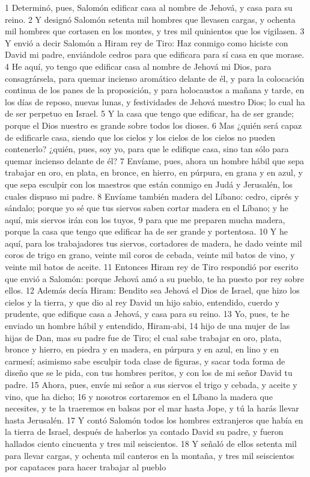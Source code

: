 1 Determinó, pues, Salomón edificar casa al nombre de Jehová, y casa para su reino.
2 Y designó Salomón setenta mil hombres que llevasen cargas, y ochenta mil hombres que cortasen en los montes, y tres mil quinientos que los vigilasen.
3 Y envió a decir Salomón a Hiram rey de Tiro: Haz conmigo como hiciste con David mi padre, enviándole cedros para que edificara para sí casa en que morase.
4 He aquí, yo tengo que edificar casa al nombre de Jehová mi Dios, para consagrársela, para quemar incienso aromático delante de él, y para la colocación continua de los panes de la proposición, y para holocaustos a mañana y tarde, en los días de reposo, nuevas lunas, y festividades de Jehová nuestro Dios; lo cual ha de ser perpetuo en Israel.
5 Y la casa que tengo que edificar, ha de ser grande; porque el Dios nuestro es grande sobre todos los dioses.
6 Mas ¿quién será capaz de edificarle casa, siendo que los cielos y los cielos de  los cielos no pueden contenerlo? ¿quién, pues, soy yo, para que le edifique casa, sino tan sólo para quemar incienso delante de él?
7 Envíame, pues, ahora un hombre hábil que sepa trabajar en oro, en plata, en bronce, en hierro, en púrpura, en grana y en azul, y que sepa esculpir con los maestros que están conmigo en Judá y Jerusalén, los cuales dispuso mi padre.
8 Envíame también madera del Líbano: cedro, ciprés y sándalo; porque yo sé que tus siervos saben cortar madera en el Líbano; y he aquí, mis siervos irán con los tuyos,
9 para que me preparen mucha madera, porque la casa que tengo que edificar ha de ser grande y portentosa.
10 Y he aquí, para los trabajadores tus siervos, cortadores de madera, he dado veinte mil coros   de trigo en grano, veinte mil coros de cebada, veinte mil batos de vino, y veinte mil batos de aceite.
11 Entonces Hiram rey de Tiro respondió por escrito que envió a Salomón: porque Jehová amó a su pueblo, te ha puesto por rey sobre ellos.
12 Además decía Hiram: Bendito sea Jehová el Dios de Israel, que hizo los cielos y la tierra, y que dio al rey David un hijo sabio, entendido, cuerdo y prudente, que edifique casa a Jehová, y casa para su reino.
13 Yo, pues, te he enviado un hombre hábil y entendido, Hiram-abi,
14 hijo de una mujer de las hijas de Dan, mas su padre fue de Tiro; el cual sabe trabajar en oro, plata, bronce y hierro, en piedra y en madera, en púrpura y en azul, en lino y en carmesí; asimismo sabe esculpir toda clase de figuras, y sacar toda forma de diseño que se le pida, con tus hombres peritos, y con los de mi señor David tu padre.
15 Ahora, pues, envíe mi señor a sus siervos el trigo y cebada, y aceite y vino, que ha dicho;
16 y nosotros cortaremos en el Líbano la madera que necesites, y te la traeremos en balsas por el mar hasta Jope, y tú la harás llevar hasta Jerusalén.
17 Y contó Salomón todos los hombres extranjeros que había en la tierra de Israel, después de haberlos ya contado David su padre, y fueron hallados ciento cincuenta y tres mil seiscientos.
18 Y señaló de ellos setenta mil para llevar cargas, y ochenta mil canteros en la montaña, y tres mil seiscientos por capataces para hacer trabajar al pueblo

